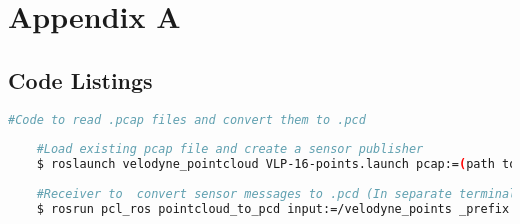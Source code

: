 %
%

\chapter{Appendix A}


\begin{table}[H]
	\centering
	
	\caption{Velodyne LiDAR Family}
	\label{velodyne-table}
\end{table}


\section{Code Listings}
\begin{lstlisting}[language=bash, caption={.pcap -> .pcd},label={lst:ros}]
	#Code to read .pcap files and convert them to .pcd 
	
	#Load existing pcap file and create a sensor publisher
	$ roslaunch velodyne_pointcloud VLP-16-points.launch pcap:=(path to .pcap file) 
	
	#Receiver to  convert sensor messages to .pcd (In separate terminal window)
	$ rosrun pcl_ros pointcloud_to_pcd input:=/velodyne_points _prefix:=(path to save .pcd file) 
	
\end{lstlisting}


